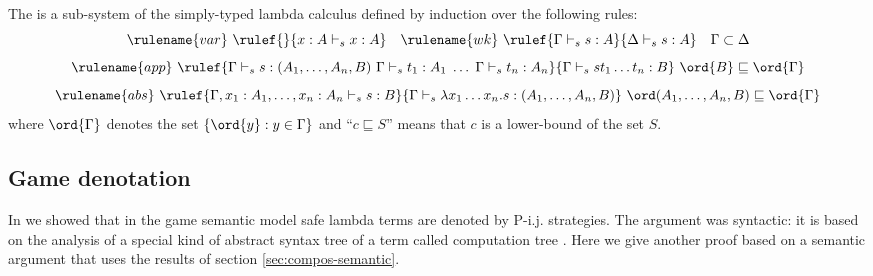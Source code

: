 \begin{definition}\rm
The  is a sub-system of the
  simply-typed lambda calculus defined by induction over the
  following rules:
$$ \rulename{var} \ \rulef{}{x : A\vdash_s x : A} \quad
\rulename{wk} \ \rulef{\Gamma \vdash_s s : A}{\Delta \vdash_s s : A} \quad
\Gamma \subset \Delta$$
$$ \rulename{app} \ \rulef{\Gamma \vdash_s s : (A_1,\ldots,A_n,B) \
  \Gamma \vdash_s t_1 : A_1 \; \ldots \; \Gamma \vdash_s t_n : A_n
} {\Gamma \vdash_s s t_1 \ldots t_n : B} \ \ord{B} \sqsubseteq
\ord{\Gamma}$$
$$ \rulename{abs} \ \rulef{\Gamma, x_1 : A_1, \ldots, x_n : A_n
  \vdash_s s : B} {\Gamma \vdash_s \lambda x_1 \ldots x_n . s :
  (A_1, \ldots ,A_n,B)} \ \ord (A_1, \ldots ,A_n,B) \sqsubseteq
\ord{\Gamma}$$ where $\ord{\Gamma}$ denotes the set $\{ \ord{y} : y
\in \Gamma \}$ and ``$c \sqsubseteq S$'' means that $c$ is a
lower-bound of the set $S$.
\end{definition}


\subsection{Game denotation}

In \cite{blumong:safelambdacalculus} we showed that in the game
semantic model safe lambda terms are denoted by P-i.j. strategies.
The argument was syntactic: it is based on the analysis of a special
kind of abstract syntax tree of a term called computation tree
\cite{OngLics2006}. Here we give another proof based on a semantic
argument that uses the results of section \ref{sec:compos-semantic}.


